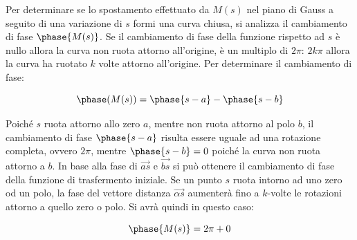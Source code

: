 \documentclass{article}
\numberwithin{equation}{subsection}
\begin{document}
\begin{center}
\end{center}

Per determinare se lo spostamento effettuato da $M(s)$ nel piano di Gauss a seguito di una variazione di $s$ formi una curva chiusa, si analizza il cambiamento di 
fase $\phase{M(s)}$. Se il cambiamento di fase della funzione rispetto ad $s$ è nullo allora la curva non ruota attorno all'origine, è un multiplo di $2\pi$: $2k\pi$ 
allora la curva ha ruotato $k$ volte attorno all'origine. Per determinare il cambiamento di fase: 

\begin{equation}
    \phase({M(s)})=\phase{s-a}-\phase{s-b}\\
\end{equation}

Poiché $s$ ruota attorno allo zero $a$, mentre non ruota attorno al polo $b$, il cambiamento di fase $\phase{s-a}$ risulta essere uguale ad una rotazione completa, ovvero 
$2\pi$, mentre $\phase{s-b}=0$ poiché la curva non ruota attorno a $b$. In base alla fase di $\vec{as}$ e $\vec{bs}$ si può ottenere il cambiamento di fase della funzione 
di trasfermento iniziale. Se un punto $s$ ruota intorno ad uno zero od un polo, la fase del vettore distanza $\vec{\alpha s}$ aumenterà fino a $k$-volte le rotazioni 
attorno a quello zero o polo. Si avrà quindi in questo caso:

\begin{equation}
    \phase{M(s)}=2\pi+0
\end{equation}
\end{document}
